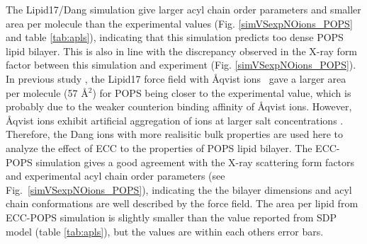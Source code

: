 \documentclass[journal=jpcbfk,manuscript=article]{achemso}
\begin{document}
The Lipid17/Dang simulation give larger acyl chain order parameters and smaller area per molecule than the
experimental values (Fig. \ref{simVSexpNOions_POPS} and table \ref{tab:apls}),
indicating that this simulation predicts too dense POPS lipid bilayer. This is also in line with
the discrepancy observed in the X-ray form factor between this simulation and experiment (Fig. \ref{simVSexpNOions_POPS}).
In previous study \cite{NMRlipidsIV}, the Lipid17 force field with {\AA}qvist ions~\cite{aqvist90}
gave a larger area per molecule (57 \AA$^2$) for POPS being closer to the experimental value,
which is probably due to the weaker counterion binding affinity of {\AA}qvist ions.
However,  {\AA}qvist ions exhibit artificial aggregation of ions at larger salt concentrations \cite{kohagen16, chen07, NMRlipidsIV}.
Therefore, the Dang ions with more realisitic bulk properties are used here to analyze the effect of ECC to the properties of POPS lipid bilayer. 
The ECC-POPS simulation gives a good agreement with the X-ray scattering form factors and experimental
acyl chain order parameters (see Fig.~\ref{simVSexpNOions_POPS}), indicating the the bilayer dimensions and acyl chain
conformations are well described by the force field. The area per lipid from ECC-POPS simulation is slightly
smaller than the value reported from SDP model \cite{kucerka14} (table \ref{tab:apls}), but the values
are within each others error bars. 


\end{document}
